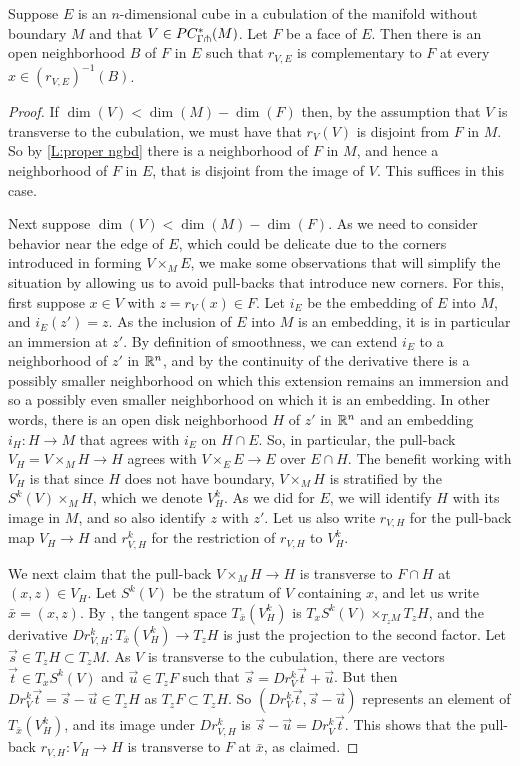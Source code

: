 \begin{lemma}\label{L:complement}
	Suppose $E$ is an $n$-dimensional cube in a cubulation of the manifold without boundary $M$ and that $V \in PC^*_{\Gamma \pitchfork}(M)$.
	Let $F$ be a face of $E$.
	Then there is an open neighborhood $B$ of $F$ in $E$ such that $r_{V,E}$ is complementary to $F$ at every $x \in (r_{V,E})^{-1}(B)$.
\end{lemma}
\begin{proof}
	If $\dim(V) < \dim(M) - \dim(F)$ then, by the assumption that $V$ is transverse to the cubulation, we must have that $r_V(V)$ is disjoint from $F$ in $M$.
	So by \cref{L:proper ngbd} there is a neighborhood of $F$ in $M$, and hence a neighborhood of $F$ in $E$, that is disjoint from the image of $V$.
	This suffices in this case.

	Next suppose $\dim(V) < \dim(M) - \dim(F)$.
	As we need to consider behavior near the edge of $E$, which could be delicate due to the corners introduced in forming $V \times_M E$, we make some observations that will simplify the situation by allowing us to avoid pull-backs that introduce new corners.
	For this, first suppose $x \in V$ with $z = r_V(x) \in F$.
	Let $i_E$ be the embedding of $E$ into $M$, and $i_E(z')=z$.
	As the inclusion of $E$ into $M$ is an embedding, it is in particular an immersion at $z'$.
	By definition of smoothness, we can extend $i_E$ to a neighborhood of $z'$ in $\mathbb{R}^n$, and by the continuity of the derivative there is a possibly smaller neighborhood on which this extension remains an immersion and so a possibly even smaller neighborhood on which it is an embedding.
	In other words, there is an open disk neighborhood $H$ of $z'$ in $\mathbb{R}^n$ and an embedding $i_H \colon H \to M$ that agrees with $i_E$ on $H \cap E$.
	So, in particular, the pull-back $V_H = V \times_M H \to H$ agrees with $V \times_E E \to E$ over $E \cap H$.
	The benefit working with $V_H$ is that since $H$ does not have boundary, $V \times_M H$ is stratified by the $S^k(V) \times_M H$, which we denote $V_H^k$.
	As we did for $E$, we will identify $H$ with its image in $M$, and so also identify $z$ with $z'$.
	Let us also write $r_{V,H}$ for the pull-back map $V_H \to H$ and $r_{V,H}^k$ for the restriction of $r_{V,H}$ to $V_H^k$.

	We next claim that the pull-back $V \times_M H \to H$ is transverse to $F \cap H$ at $(x,z) \in V_H$.
	Let $S^k(V)$ be the stratum of $V$ containing $x$, and let us write $\bar{x} = (x,z)$.
	By \cite[Lemma 2.28 and Corollary 2.29]{medina2022foundations}, the tangent space $T_{\bar{x}}(V^k_H)$ is $T_xS^k(V) \times_{T_zM} T_zH$, and the derivative $Dr_{V,H}^k \colon T_{\bar{x}}(V^k_H) \to T_zH$ is just the projection to the second factor.
	Let $\vec s \in T_zH \subset T_z M$.
	As $V$ is transverse to the cubulation, there are vectors $\vec t \in T_xS^k(V)$ and $\vec u \in T_zF$ such that $\vec s = Dr^k_V \vec t + \vec u$.
	But then $Dr^k_V\vec t = \vec s - \vec u \in T_zH$ as $T_zF \subset T_zH$.
	So $(Dr^k_V\vec t, \vec s - \vec u)$ represents an element of $T_{\bar{x}}(V^k_H)$, and its image under $Dr_{V,H}^k$ is $\vec s - \vec u = Dr^k_V\vec t$.
	This shows that the pull-back $r_{V,H} \colon V_H \to H$ is transverse to $F$ at $\bar{x}$, as claimed.


\end{proof}
